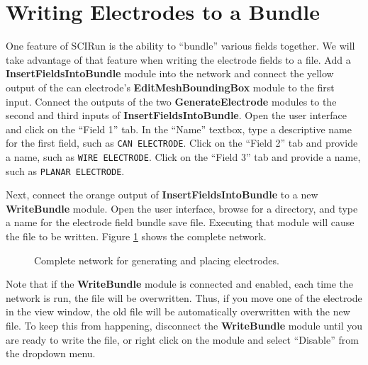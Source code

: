 \documentclass[fleqn,11pt,openany]{book}
\begin{document}
\section{Writing Electrodes to a Bundle}\label{sec:write_bundle}

One feature of SCIRun is the ability to ``bundle'' various fields
together. We will take advantage of that feature when writing the
electrode fields to a file. Add a {\bf InsertFieldsIntoBundle} module
into the network and connect the yellow output of the can electrode's
{\bf EditMeshBoundingBox} module to the first input. Connect the
outputs of the two {\bf GenerateElectrode} modules to the second and
third inputs of
{\bf InsertFieldsIntoBundle}. Open the user interface and click on the
``Field 1'' tab. In the ``Name'' textbox, type a descriptive name for
the first field, such as {\tt CAN ELECTRODE}. Click on the ``Field 2''
tab and provide a name, such as {\tt WIRE ELECTRODE}. Click on the
``Field 3'' tab and provide a name, such as {\tt PLANAR ELECTRODE}.

Next, connect the orange output of {\bf InsertFieldsIntoBundle} to a
new {\bf WriteBundle} module. Open the user interface, browse for a
directory, and type a name for the electrode field bundle save
file. Executing that module will cause the file to be written. Figure
\ref{fig:p_e_network_7} shows the complete network.

\begin{figure}
\caption{Complete network for generating and placing
electrodes.}\label{fig:p_e_network_7}
\end{figure}

Note that if the {\bf WriteBundle} module is connected and enabled,
each time the network is run, the file will be overwritten. Thus, if
you move one of the electrode in the view window, the old file will be
automatically overwritten with the new file. To keep this from
happening, disconnect the {\bf WriteBundle} module until you are ready
to write the file, or right click on the module and select ``Disable''
from the dropdown menu.
\end{document}
